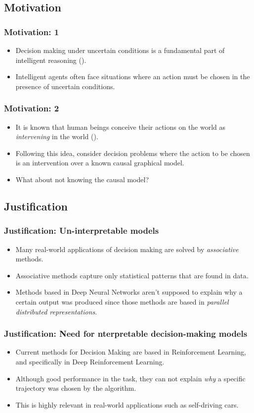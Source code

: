 \documentclass{beamer}
\theoremstyle{plain}
\begin{document}
	\subsection{Motivation}
	\begin{frame}
	\frametitle{Motivation: 1}
	\begin{itemize}
	\item Decision making under uncertain conditions is a fundamental part of intelligent reasoning (\cite{lake2017building}).
	\item Intelligent agents often face situations where an action must be chosen in the presence of uncertain conditions.
	\end{itemize}
	\end{frame}
	\begin{frame}
	\frametitle{Motivation: 2}
	\begin{itemize}
	\item It is known that human beings conceive their actions on the world as \textit{intervening} in the world (\cite{hagmayer2009decision}).
	\item Following this idea, \cite{lattimoreNIPS2016} consider decision problems where the action to be chosen is an intervention over a known causal graphical model.
	\item What about not knowing the causal model? 
	\end{itemize}
	\end{frame}
	
	\subsection{Justification}
	\begin{frame}
	\frametitle{Justification: Un-interpretable models}
	\begin{itemize}
	\item Many real-world applications of decision making are solved by \textit{associative} methods.
	\item Associative methods capture only statistical patterns that are found in data.
	\item Methods based in Deep Neural Networks aren't supposed to explain why a certain output was produced since those methods are based in \textit{parallel distributed representations}.
	\end{itemize}
	\end{frame}
	
	\begin{frame}
	\frametitle{Justification: Need for nterpretable decision-making models}
	\begin{itemize}
	\item Current methods for Decision Making are based in Reinforcement Learning, and specifically in Deep Reinforcement Learning. 
	\item Although good performance in the task, they can not explain \textit{why} a specific trajectory was chosen by the algorithm.
	\item This is highly relevant in real-world applications such as self-driving cars.
	\end{itemize}
	\end{frame}
	
\end{document}
